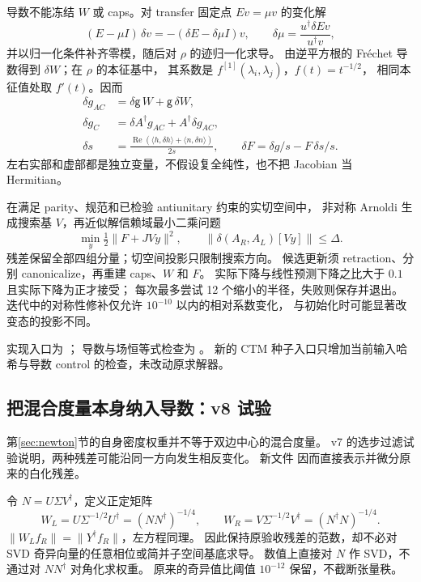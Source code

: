 \documentclass[11pt]{article}
\begin{document}
导数不能冻结 $W$ 或 caps。对 transfer 固定点 $Ev=\mu v$ 的变化解
\begin{equation}
 (E-\mu I)\,\delta v=-(\delta E-\delta\mu I)v,
 \qquad \delta\mu=\frac{u^\dagger\delta E v}{u^\dagger v},
\end{equation}
并以归一化条件补齐零模，随后对 $\rho$ 的迹归一化求导。
由逆平方根的 Fr\'echet 导数得到 $\delta W$；在 $\rho$ 的本征基中，
其系数是 $f^{[1]}(\lambda_i,\lambda_j)$，$f(t)=t^{-1/2}$，
相同本征值处取 $f'(t)$。因而
\begin{align}
 \delta g_{AC}&=\delta\mathsf g\,W+\mathsf g\,\delta W,\\
 \delta g_C&=\delta A^\dagger g_{AC}+A^\dagger\delta g_{AC},\\
 \delta s&=\frac{\operatorname{Re}(\langle h,\delta h\rangle+
                \langle n,\delta n\rangle)}{2s},\qquad
 \delta F=\delta g/s-F\,\delta s/s.
\end{align}
左右实部和虚部都是独立变量，不假设复全纯性，也不把 Jacobian 当 Hermitian。

在满足 parity、规范和已检验 antiunitary 约束的实切空间中，
非对称 Arnoldi 生成搜索基 $V$，再近似解信赖域最小二乘问题
\begin{equation}
 \min_y\tfrac12\|F+JVy\|^2,
 \qquad \|\delta(A_R,A_L)[Vy]\|\le\Delta .
\end{equation}
残差保留全部四组分量；切空间投影只限制搜索方向。
候选更新须 retraction、分别 canonicalize，再重建 caps、$W$ 和 $F$。
实际下降与线性预测下降之比大于 $0.1$ 且实际下降为正才接受；
每次最多尝试 12 个缩小的半径，失败则保存并退出。
迭代中的对称性修补仅允许 $10^{-10}$ 以内的相对系数变化，
与初始化时可能显著改变态的投影不同。

实现入口为 ；
导数与场恒等式检查为 。
新的 CTM 种子入口只增加当前输入哈希与导数 control 的检查，未改动原求解器。

\subsection{把混合度量本身纳入导数：v8 试验}
\label{sec:mixedresponse}
第\ref{sec:newton}节的自身密度权重并不等于双边中心的混合度量。
v7 的选步过滤试验说明，两种残差可能沿同一方向发生相反变化。
新文件 
因而直接表示并微分原来的白化残差。

令 $N=U\Sigma V^\dagger$，定义正定矩阵
\begin{equation}
 W_L=U\Sigma^{-1/2}U^\dagger=(NN^\dagger)^{-1/4},\qquad
 W_R=V\Sigma^{-1/2}V^\dagger=(N^\dagger N)^{-1/4}.
\end{equation}
$\|W_L f_R\|=\|Y^\dagger f_R\|$，左方程同理。
因此保持原验收残差的范数，却不必对 SVD 奇异向量的任意相位或简并子空间基底求导。
数值上直接对 $N$ 作 SVD，不通过对 $NN^\dagger$ 对角化求权重。
原来的奇异值比阈值 $10^{-12}$ 保留，不截断张量秩。
\end{document}
